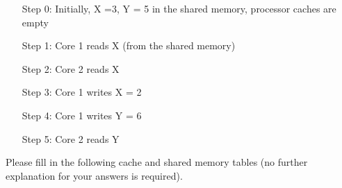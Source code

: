 \documentclass[a4paper,10pt]{article}
\begin{document}
\begin{enumerate}
{        \begin{itemize}
            \item[Step 0: ]{Initially, X =3, Y = 5 in the shared memory, processor caches are empty}
            \item[Step 1: ]{Core 1 reads X (from the shared memory)}
            \item[Step 2: ]{Core 2 reads X}
            \item[Step 3: ]{Core 1 writes X = 2}
            \item[Step 4: ]{Core 1 writes Y = 6}
            \item[Step 5: ]{Core 2 reads Y}
        \end{itemize}
        
        Please fill in the following cache and shared memory tables (no further explanation for your answers is required).
        
}
\end{enumerate}
\end{document}

